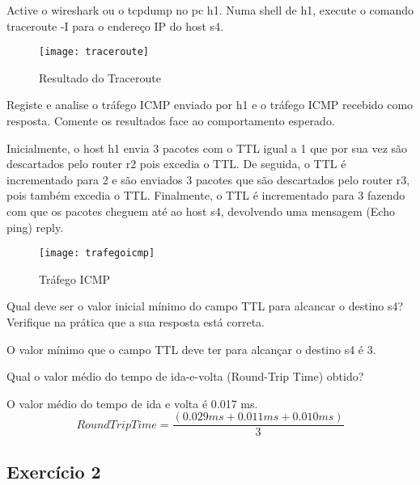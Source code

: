 \documentclass{exam}
\begin{document}
\begin{questions}

\question Active o wireshark ou o tcpdump no pc h1. 
Numa shell de h1, execute o comando traceroute -I para o endereço IP 
do host s4.
\begin{solution}
\begin{figure}[H]
\centering\texttt{[image: traceroute]} 
\caption{\label{fig:controller}Resultado do Traceroute}
\end{figure}
\end{solution}

\question Registe e analise o tráfego ICMP enviado por h1 e o tráfego ICMP recebido como resposta. Comente os resultados face ao comportamento esperado.
\begin{solution}
Inicialmente, o host h1 envia 3 pacotes com o TTL igual a 1 que por sua vez são descartados pelo router r2 pois excedia o TTL. 
De seguida, o TTL é incrementado para 2 e são enviados 3 pacotes que são descartados pelo router r3, 
pois também excedia o TTL. Finalmente, o TTL é incrementado para 3 fazendo com que os pacotes
cheguem até ao host s4, devolvendo uma mensagem (Echo ping) reply.
\begin{figure}[H]
\centering\texttt{[image: trafegoicmp]} 
\caption{\label{fig:controller}Tráfego ICMP}
\end{figure} 
\end{solution}

\question Qual deve ser o valor inicial mínimo do campo TTL para alcancar o destino s4? Verifique na prática que a sua resposta está correta.
\begin{solution}
O valor mínimo que o campo TTL deve ter para alcançar o destino s4 é 3. 
\end{solution}

\question Qual o valor médio do tempo de ida-e-volta (Round-Trip Time) obtido?
\begin{solution}
O valor médio do tempo de ida e volta é 0.017 ms.
\begin{equation}
Round Trip Time= \frac{(0.029 ms + 0.011 ms + 0.010 ms)}{3}
\end{equation}
\end{solution}

\end{questions}

\subsection{Exercício 2}
\end{document}
